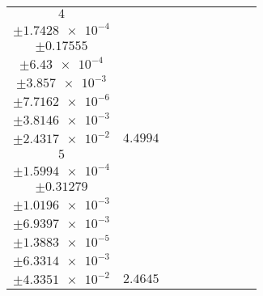 \documentclass[8pt]{article}
\begin{document}
\begin{longtable}[l]{c c c c c c c c c}
$\num{4}$ & \begin{tabular}[c]{@{}c@{}}$\num{5.8586e-2}$ \\ $\pm\num{1.7428e-4}$\end{tabular} & \begin{tabular}[c]{@{}c@{}}$\num{-5.4887e-2}$ \\ $\pm\num{0.17555}$\end{tabular} & \begin{tabular}[c]{@{}c@{}}$\num{0.49566}$ \\ $\pm\num{6.43e-4}$\end{tabular} & \begin{tabular}[c]{@{}c@{}}$\num{3.5479e+3}$ \\ $\pm\num{3.857e-3}$\end{tabular} & \begin{tabular}[c]{@{}c@{}}$\num{7.0978}$ \\ $\pm\num{7.7162e-6}$\end{tabular} & \begin{tabular}[c]{@{}c@{}}$\num{1.3185}$ \\ $\pm\num{3.8146e-3}$\end{tabular} & \begin{tabular}[c]{@{}c@{}}$\num{4.2518}$ \\ $\pm\num{2.4317e-2}$\end{tabular} & $\num{4.4994}$\\
$\num{5}$ & \begin{tabular}[c]{@{}c@{}}$\num{3.0467e-2}$ \\ $\pm\num{1.5994e-4}$\end{tabular} & \begin{tabular}[c]{@{}c@{}}$\num{1.3665}$ \\ $\pm\num{0.31279}$\end{tabular} & \begin{tabular}[c]{@{}c@{}}$\num{6.9248}$ \\ $\pm\num{1.0196e-3}$\end{tabular} & \begin{tabular}[c]{@{}c@{}}$\num{3.5543e+3}$ \\ $\pm\num{6.9397e-3}$\end{tabular} & \begin{tabular}[c]{@{}c@{}}$\num{7.1106}$ \\ $\pm\num{1.3883e-5}$\end{tabular} & \begin{tabular}[c]{@{}c@{}}$\num{1.1789}$ \\ $\pm\num{6.3314e-3}$\end{tabular} & \begin{tabular}[c]{@{}c@{}}$\num{4.1874}$ \\ $\pm\num{4.3351e-2}$\end{tabular} & $\num{2.4645}$\\

\end{longtable}
\end{document}
